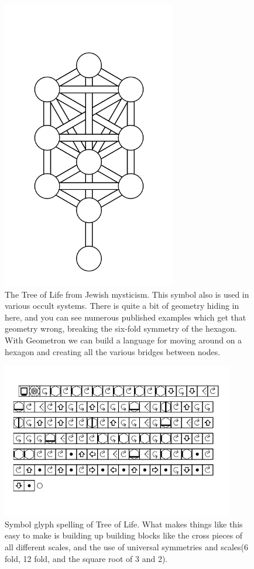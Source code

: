 \begin{figure}
	\centering
	\includegraphics[width=3in]{figures/shapes/treeoflife.png}
	\caption[treeoflife]
	{The Tree of Life from Jewish mysticism.  This symbol also is used in various occult systems.  There is quite a bit of geometry hiding in here, and you can see numerous published examples which get that geometry wrong, breaking the six-fold symmetry of the hexagon.  With Geometron we can build a language for moving around on a hexagon and creating all the various bridges between nodes.}
\end{figure}

\begin{figure}
	\centering
	\includegraphics[width=4in]{figures/shapes/treeoflifespelling.png}
	\caption[treeoflifespelling]
	{Symbol glyph spelling of Tree of Life. What makes things like this easy to make is building up building blocks like the cross pieces of all different scales, and the use of universal symmetries and scales(6 fold, 12 fold, and the square root of 3 and 2).}
\end{figure}

